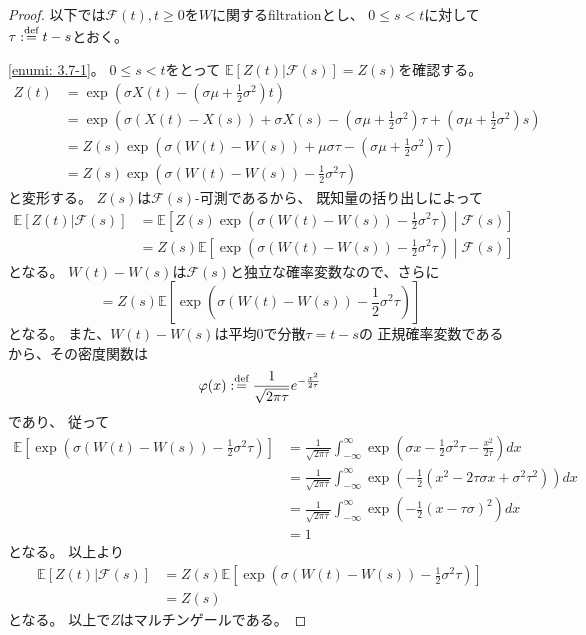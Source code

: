\documentclass[uplatex]{jsarticle}
\theoremstyle{definition}
\def\E{\mathbb{E}}
\def\mcF{\mathcal{F}}
\def\dfn{:\overset{\mbox{{\scriptsize def}}}{=}}
\begin{document}
\begin{proof}
  以下では\(\mcF(t) , t\geq 0\)を\(W\)に関するfiltrationとし、
  \(0\leq s < t\)に対して\(\tau \dfn t-s\)とおく。

  \ref{enumi: 3.7-1}。
  \(0\leq s < t\)をとって
  \(\E[Z(t)|\mcF(s)] = Z(s)\)を確認する。
  \begin{align*}
    Z(t) &= \exp \left( \sigma X(t)
    - \left( \sigma\mu + \frac{1}{2}\sigma^2\right) t\right) \\
    &= \exp \left( \sigma (X(t)-X(s)) + \sigma X(s)
    - \left( \sigma\mu + \frac{1}{2}\sigma^2\right) \tau
    + \left( \sigma\mu + \frac{1}{2}\sigma^2\right) s \right) \\
    &= Z(s)\exp \left( \sigma (W(t)-W(s)) + \mu\sigma\tau
    - \left( \sigma\mu + \frac{1}{2}\sigma^2\right) \tau \right) \\
    &= Z(s)\exp \left( \sigma (W(t)-W(s)) - \frac{1}{2}\sigma^2\tau \right)
  \end{align*}
  と変形する。
  \(Z(s)\)は\(\mcF(s)\)-可測であるから、
  既知量の括り出しによって
  \begin{align*}
    \E[Z(t)|\mcF(s)] &=
    \E\left[Z(s)\exp \left( \sigma (W(t)-W(s))
    - \frac{1}{2}\sigma^2\tau \right) \middle| \mcF(s)\right] \\
    &= Z(s)\E\left[\exp \left( \sigma (W(t)-W(s))
    - \frac{1}{2}\sigma^2\tau \right) \middle| \mcF(s)\right]
  \end{align*}
  となる。
  \(W(t)-W(s)\)は\(\mcF(s)\)と独立な確率変数なので、さらに
  \[
  = Z(s)\E\left[\exp \left( \sigma (W(t)-W(s))
  - \frac{1}{2}\sigma^2\tau \right)\right]
  \]
  となる。
  また、\(W(t)-W(s)\)は平均\(0\)で分散\(\tau = t-s\)の
  正規確率変数であるから、その密度関数は
  \[\varphi(x) \dfn \frac{1}{\sqrt{2\pi\tau}}e^{-\frac{x^2}{2\tau}}\]
  であり、
  従って
  \begin{align*}
    \E\left[\exp \left( \sigma (W(t)-W(s))
    - \frac{1}{2}\sigma^2\tau \right)\right]
    &= \frac{1}{\sqrt{2\pi\tau}} \int_{-\infty}^\infty
    \exp\left( \sigma x - \frac{1}{2}\sigma^2\tau
    - \frac{x^2}{2\tau}\right) dx \\
    &= \frac{1}{\sqrt{2\pi\tau}} \int_{-\infty}^\infty
    \exp\left( -\frac{1}{2}
    \left( x^2 - 2\tau\sigma x + \sigma^2\tau^2 \right)\right) dx \\
    &= \frac{1}{\sqrt{2\pi\tau}} \int_{-\infty}^\infty
    \exp\left( -\frac{1}{2}( x - \tau\sigma)^2\right) dx \\
    &= 1
  \end{align*}
  となる。
  以上より
  \begin{align*}
    \E[Z(t)|\mcF(s)]
    &= Z(s)\E\left[\exp \left( \sigma (W(t)-W(s))
    - \frac{1}{2}\sigma^2\tau \right)\right] \\
    &= Z(s)
  \end{align*}
  となる。
  以上で\(Z\)はマルチンゲールである。


\end{proof}
\end{document}
